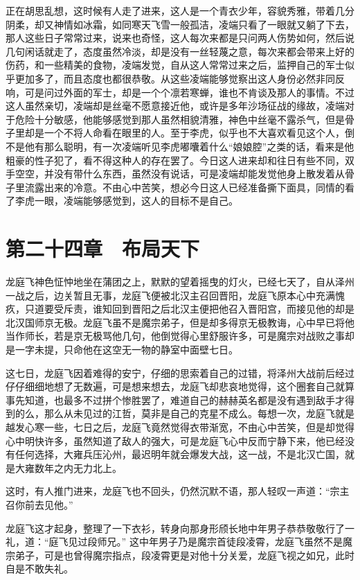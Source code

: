 正在胡思乱想，这时候有人走了进来，这人是一个青衣少年，容貌秀雅，带着几分阴柔，却又神情如冰霜，如同寒天飞雪一般孤洁，凌端只看了一眼就又躺了下去，那人这些日子常常过来，说来也奇怪，这人每次来都是只问两人伤势如何，然后说几句闲话就走了，态度虽然冷淡，却是没有一丝轻蔑之意，每次来都会带来上好的伤药，和一些精美的食物，凌端发觉，自从这人常常过来之后，监押自己的军士似乎更加多了，而且态度也都很恭敬。从这些凌端能够觉察出这人身份必然非同反响，可是问过外面的军士，却是一个个凛若寒蝉，谁也不肯谈及那人的事情。不过这人虽然亲切，凌端却是丝毫不愿意接近他，或许是多年沙场征战的缘故，凌端对于危险十分敏感，他能够感觉到那人虽然相貌清雅，神色中丝毫不露杀气，但是骨子里却是一个不将人命看在眼里的人。至于李虎，似乎也不大喜欢看见这个人，倒不是他有那么聪明，有一次凌端听见李虎嘟囔着什么“娘娘腔”之类的话，看来是他粗豪的性子犯了，看不得这种人的存在罢了。今日这人进来却和往日有些不同，双手空空，并没有带什么东西，虽然没有说话，可是凌端却能发觉他身上散发着从骨子里流露出来的冷意。不由心中苦笑，想必今日这人已经准备撕下面具，同情的看了李虎一眼，凌端能够感觉到，这人的目标不是自己。

\chapter{第二十四章　布局天下}

龙庭飞神色怔忡地坐在蒲团之上，默默的望着摇曳的灯火，已经七天了，自从泽州一战之后，边关暂且无事，龙庭飞便被北汉主召回晋阳，龙庭飞原本心中充满愧疚，只道要受斥责，谁知回到晋阳之后北汉主便把他召入晋阳宫，而接见他的却是北汉国师京无极。龙庭飞虽不是魔宗弟子，但是却多得京无极教诲，心中早已将他当作师长，若是京无极骂他几句，他倒觉得心里舒服许多，可是魔宗对战败之事却是一字未提，只命他在这空无一物的静室中面壁七日。

这七日，龙庭飞因着难得的安宁，仔细的思索着自己的过错，将泽州大战前后经过仔仔细细地想了无数遍，可是想来想去，龙庭飞却悲哀地觉得，这个圈套自己就算事先知道，也最多不过拼个惨胜罢了，难道自己的赫赫英名都是没有遇到敌手才得到的么，那么从未见过的江哲，莫非是自己的克星不成么。每想一次，龙庭飞就是越发心寒一些，七日之后，龙庭飞竟然觉得衣带渐宽，不由心中苦笑，但是却觉得心中明快许多，虽然知道了敌人的强大，可是龙庭飞心中反而宁静下来，他已经没有任何选择，大雍兵压沁州，最迟明年就会爆发大战，这一战，不是北汉亡国，就是大雍数年之内无力北上。

这时，有人推门进来，龙庭飞也不回头，仍然沉默不语，那人轻叹一声道：“宗主召你前去见他。”

龙庭飞这才起身，整理了一下衣衫，转身向那身形颀长地中年男子恭恭敬敬行了一礼，道：“庭飞见过段师兄。” 这中年男子乃是魔宗首徒段凌霄，龙庭飞虽然不是魔宗弟子，可是也曾得魔宗指点，段凌霄更是对他十分关爱，龙庭飞视之如兄，此时自是不敢失礼。

